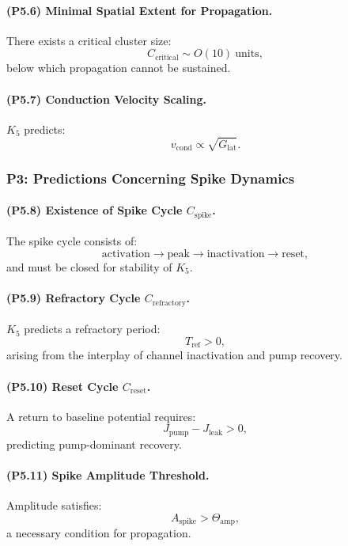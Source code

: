 \paragraph{(P5.6) Minimal Spatial Extent for Propagation.}
There exists a critical cluster size:
\[
C_{\mathrm{critical}} \sim O(10) \ \text{units},
\]
below which propagation cannot be sustained.

\paragraph{(P5.7) Conduction Velocity Scaling.}
$K_5$ predicts:
\[
v_{\mathrm{cond}} \propto \sqrt{G_{\mathrm{lat}}}.
\]

\subsubsection{P3: Predictions Concerning Spike Dynamics}

\paragraph{(P5.8) Existence of Spike Cycle $C_{\mathrm{spike}}$.}
The spike cycle consists of:
\[
\text{activation} \to \text{peak} \to \text{inactivation} \to \text{reset},
\]
and must be closed for stability of $K_5$.

\paragraph{(P5.9) Refractory Cycle $C_{\mathrm{refractory}}$.}
$K_5$ predicts a refractory period:
\[
T_{\mathrm{ref}} > 0,
\]
arising from the interplay of channel inactivation and pump recovery.

\paragraph{(P5.10) Reset Cycle $C_{\mathrm{reset}}$.}
A return to baseline potential requires:
\[
J_{\mathrm{pump}} - J_{\mathrm{leak}} > 0,
\]
predicting pump-dominant recovery.

\paragraph{(P5.11) Spike Amplitude Threshold.}
Amplitude satisfies:
\[
A_{\mathrm{spike}} > \Theta_{\mathrm{amp}},
\]
a necessary condition for propagation.

